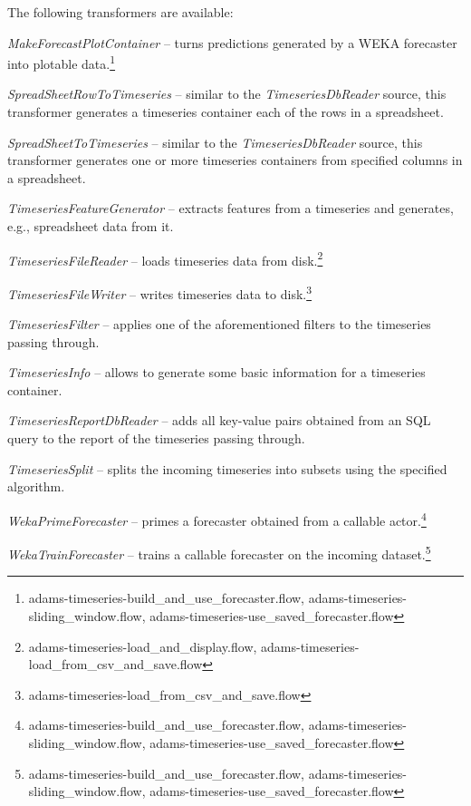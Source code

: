 \documentclass[a4paper]{book}
\begin{document}
\noindent The following transformers are available:
\begin{tight_itemize}
	\item \textit{MakeForecastPlotContainer} -- turns predictions generated
	by a WEKA forecaster into plotable data.\footnote{adams-timeseries-build\_and\_use\_forecaster.flow, adams-timeseries-sliding\_window.flow, adams-timeseries-use\_saved\_forecaster.flow}
	\item \textit{SpreadSheetRowToTimeseries} -- similar to the 
	\textit{TimeseriesDbReader} source, this transformer generates a 
	timeseries container each of the rows in a spreadsheet.
	\item \textit{SpreadSheetToTimeseries} -- similar to the 
	\textit{TimeseriesDbReader} source, this transformer generates one or more
	timeseries containers from specified columns in a spreadsheet.
	\item \textit{TimeseriesFeatureGenerator} -- extracts features from a
	timeseries and generates, e.g., spreadsheet data from it.
	\item \textit{TimeseriesFileReader} -- loads timeseries data from 
	disk.\footnote{adams-timeseries-load\_and\_display.flow, adams-timeseries-load\_from\_csv\_and\_save.flow}
	\item \textit{TimeseriesFileWriter} -- writes timeseries data to 
	disk.\footnote{adams-timeseries-load\_from\_csv\_and\_save.flow}
	\item \textit{TimeseriesFilter} -- applies one of the aforementioned filters
	to the timeseries passing through.
	\item \textit{TimeseriesInfo} -- allows to generate some basic information
	for a timeseries container.
	\item \textit{TimeseriesReportDbReader} -- adds all key-value pairs obtained
	from an SQL query to the report of the timeseries passing through.
	\item \textit{TimeseriesSplit} -- splits the incoming timeseries into
	subsets using the specified algorithm.
	\item \textit{WekaPrimeForecaster} -- primes a forecaster obtained from
	a callable actor.\footnote{adams-timeseries-build\_and\_use\_forecaster.flow, adams-timeseries-sliding\_window.flow, adams-timeseries-use\_saved\_forecaster.flow}
	\item \textit{WekaTrainForecaster} -- trains a callable forecaster
	on the incoming dataset.\footnote{adams-timeseries-build\_and\_use\_forecaster.flow, adams-timeseries-sliding\_window.flow, adams-timeseries-use\_saved\_forecaster.flow}
\end{tight_itemize}
\end{document}
